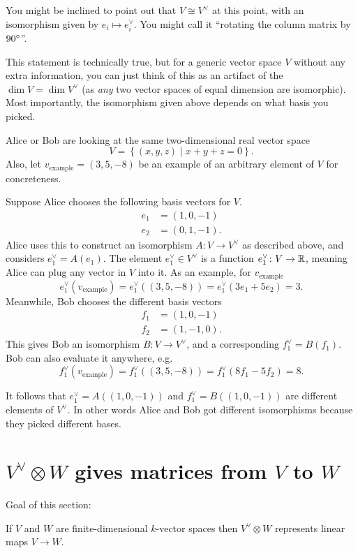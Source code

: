 You might be inclined to point out that $V \cong V^\vee$ at this point,
with an isomorphism given by $e_i \mapsto e_i^\vee$.
You might call it ``rotating the column matrix by $90^\circ$''.

This statement is technically true,
but for a generic vector space $V$ without any extra information,
you can just think of this as an artifact of the $\dim V = \dim V^\vee$
(as \emph{any} two vector spaces of equal dimension are isomorphic).
Most importantly, the isomorphism given above depends
on what basis you picked.

\begin{remark*}
	Alice or Bob are looking at the same two-dimensional real vector space
	\[ V = \left\{ (x,y,z) \mid x+y+z = 0 \right\}. \]
	Also, let $v_{\text{example}} = (3,5,-8)$
	be an example of an arbitrary element of $V$ for concreteness.

	Suppose Alice chooses the following basis vectors for $V$.
	\begin{align*}
		e_1 &= (1,0,-1) \\
		e_2 &= (0,1,-1).
	\end{align*}
	Alice uses this to construct an isomorphism $A \colon V \to V^\vee$
	as described above, and considers $e_1^\vee = A(e_1)$.
	The element $e_1^\vee \in V^\vee$ is a
	function $e_1^\vee \colon V \to \mathbb R$,
	meaning Alice can plug any vector in $V$ into it.
	As an example, for $v_{\text{example}}$
	\[ e_1^\vee(v_{\text{example}})
		= e_1^\vee\left( (3,5,-8) \right)
		= e_1^\vee\left( 3e_1 + 5e_2 \right) = 3. \]
	Meanwhile, Bob chooses the different basis vectors
	\begin{align*}
		f_1 &= (1,0,-1) \\
		f_2 &= (1,-1,0).
	\end{align*}
	This gives Bob an isomorphism $B \colon V \to V^\vee$,
	and a corresponding $f_1^\vee = B(f_1)$.
	Bob can also evaluate it anywhere, e.g.
	\[ f_1^\vee\left( v_{\text{example}} \right)
		= f_1^\vee\left( (3, 5, -8) \right)
		= f_1^\vee\left( 8f_1 - 5f_2 \right) = 8. \]

	It follows that $e_1^\vee = A\left( (1,0,-1) \right)$
	and $f_1^\vee = B\left( (1,0,-1) \right)$
	are different elements of $V^\vee$.
	In other words Alice and Bob got different isomorphisms
	because they picked different bases.
\end{remark*}

\section{$V^\vee \otimes W$ gives matrices from $V$ to $W$}
Goal of this section:
\begin{moral}
	If $V$ and $W$ are finite-dimensional $k$-vector spaces
	then $V^\vee \otimes W$ represents linear maps $V \to W$.
\end{moral}

